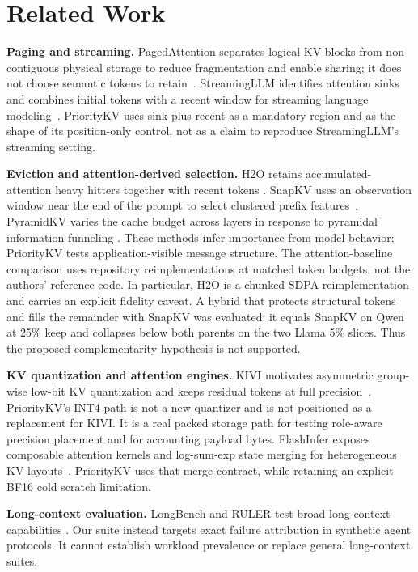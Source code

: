 \documentclass[10pt]{article}
\begin{document}
\section{Related Work}
\label{sec:related}

\textbf{Paging and streaming.}
PagedAttention separates logical KV blocks from non-contiguous physical storage
to reduce fragmentation and enable sharing; it does not choose semantic tokens
to retain~\cite{kwon2023pagedattention}.  StreamingLLM identifies attention
sinks and combines initial tokens with a recent window for streaming language
modeling~\cite{xiao2024streamingllm}.  PriorityKV uses sink plus recent as a
mandatory region and as the shape of its position-only control, not as a claim
to reproduce StreamingLLM's streaming setting.

\textbf{Eviction and attention-derived selection.}
H2O retains accumulated-attention heavy hitters together with recent tokens
\cite{zhang2023h2o}.  SnapKV uses an observation window near the end of the
prompt to select clustered prefix features~\cite{li2024snapkv}.  PyramidKV varies
the cache budget across layers in response to pyramidal information funneling
\cite{cai2024pyramidkv}.  These methods infer importance from model behavior;
PriorityKV tests application-visible message structure.  The attention-baseline
comparison uses repository reimplementations at matched token budgets, not the
authors' reference code.  In particular, H2O is a chunked SDPA
reimplementation and carries an explicit fidelity caveat.  A hybrid that
protects structural tokens and fills the remainder with SnapKV was evaluated:
it equals SnapKV on Qwen at 25\% keep and collapses below both parents on the two
Llama 5\% slices.  Thus the proposed complementarity hypothesis is not
supported.

\textbf{KV quantization and attention engines.}
KIVI motivates asymmetric group-wise low-bit KV quantization and keeps residual
tokens at full precision~\cite{liu2024kivi}.  PriorityKV's INT4 path is not a new
quantizer and is not positioned as a replacement for KIVI.  It is a real packed
storage path for testing role-aware precision placement and for accounting
payload bytes.  FlashInfer exposes composable attention kernels and
log-sum-exp state merging for heterogeneous KV layouts~\cite{ye2025flashinfer}.
PriorityKV uses that merge contract, while retaining an explicit BF16 cold
scratch limitation.

\textbf{Long-context evaluation.}
LongBench and RULER test broad long-context capabilities
\cite{bai2024longbench,hsieh2024ruler}.  Our suite instead targets exact failure
attribution in synthetic agent protocols.  It cannot establish workload
prevalence or replace general long-context suites.
\end{document}
